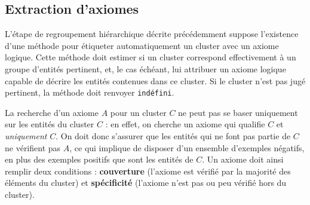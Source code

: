 %



\subsection{Extraction d'axiomes}
\label{subsec:texp-exaxiom}

L'étape de regroupement hiérarchique décrite précédemment suppose l'existence d'une méthode pour étiqueter automatiquement un cluster avec un axiome logique. Cette méthode doit estimer si un cluster correspond effectivement à un groupe d'entités pertinent, et, le cas échéant, lui attribuer un axiome logique capable de décrire les entités contenues dans ce cluster. Si le cluster n'est pas jugé pertinent, la méthode doit renvoyer \texttt{indéfini}.

La recherche d'un axiome $A$ pour un cluster $C$ ne peut pas se baser uniquement sur les entités du cluster $C$ : en effet, on cherche un axiome qui qualifie $C$ et \textit{uniquement} $C$. On doit donc s'assurer que les entités qui ne font pas partie de $C$ ne vérifient pas $A$, ce qui implique de disposer d'un ensemble d'exemples négatifs, en plus des exemples positifs que sont les entités de $C$. Un axiome doit ainsi remplir deux conditions : \textbf{couverture} (l'axiome est vérifié par la majorité des éléments du cluster) et \textbf{spécificité} (l'axiome n'est pas ou peu vérifié hors du cluster). 

